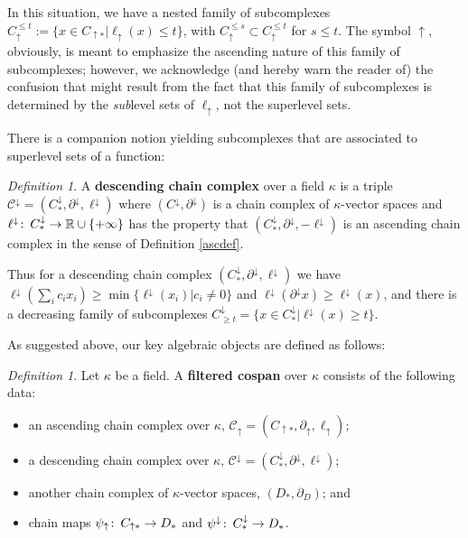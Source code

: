 \documentclass[11pt]{amsart}
\theoremstyle{definition}
\theoremstyle{remark}
\newtheorem{dfn}[theorem]{Definition}
\numberwithin{equation}{section}
\def\co{\colon\thinspace}
\def\R{\mathbb{R}}
\begin{document}
	In this situation, we have a nested family of subcomplexes $C_{\uparrow}^{\leq t}:=\{x\in C_{\uparrow *}|\ell_{\uparrow}(x)\leq t\}$, with $C_{\uparrow}^{\leq s}\subset C_{\uparrow }^{\leq t}$ for $s\leq t$.
	The symbol $\uparrow$, obviously, is meant to emphasize the ascending nature of this family of subcomplexes; however, we acknowledge (and hereby warn the reader of) the confusion that might result from the fact that this family of subcomplexes is determined by the \emph{sub}level sets of $\ell_{\uparrow}$, not the superlevel sets.  
	
	There is a companion notion yielding subcomplexes that are associated to superlevel sets of a function:
	
	\begin{dfn}\label{descdef}
		 A \textbf{descending chain complex} over a field $\kappa$ is a triple $\mathcal{C}^{\downarrow}=(C^{\downarrow}_{*},\partial^{\downarrow},\ell^{\downarrow})$ where $(C^{\downarrow},\partial^{\downarrow})$ is a chain complex of $\kappa$-vector spaces and $\ell^{\downarrow}\co C^{\downarrow}_{*}\to \R\cup\{+\infty\}$ has the property that $(C^{\downarrow}_{*},\partial^{\downarrow},-\ell^{\downarrow})$ is an ascending chain complex in the sense of Definition \ref{ascdef}.
	\end{dfn}
	
	Thus for a descending chain complex $(C^{\downarrow}_{*},\partial^{\downarrow},\ell^{\downarrow})$ we have $\ell^{\downarrow}\left(\sum_ic_ix_i\right)\geq \min\{\ell^{\downarrow}(x_i)|c_i\neq 0\}$ and $\ell^{\downarrow}(\partial^{\downarrow}x)\geq \ell^{\downarrow}(x)$, and there is a decreasing family of subcomplexes $C^{\downarrow}_{\geq t}=\{x\in C^{\downarrow}_{*}|\ell^{\downarrow}(x)\geq t\}$.



As suggested above, our key algebraic objects are defined as follows:
	\begin{dfn}\label{codfn}
	Let $\kappa$ be a field.  A \textbf{filtered cospan} over $\kappa$ consists of the following data:
	\begin{itemize} \item an ascending chain complex over $\kappa$, $\mathcal{C}_{\uparrow}=(C_{\uparrow *},\partial_{\uparrow},\ell_{\uparrow})$;
		\item a descending chain complex over $\kappa$, $\mathcal{C}^{\downarrow}=(C^{\downarrow}_{*},\partial^{\downarrow},\ell^{\downarrow})$;
		\item another chain complex of $\kappa$-vector spaces, $(D_*,\partial_D)$; and
		\item chain maps $\psi_{\uparrow}\co C_{\uparrow *}\to D_*$ and $\psi^{\downarrow}\co C^{\downarrow}_{*}\to D_*$.	\end{itemize}		
\end{dfn}
\end{document}
